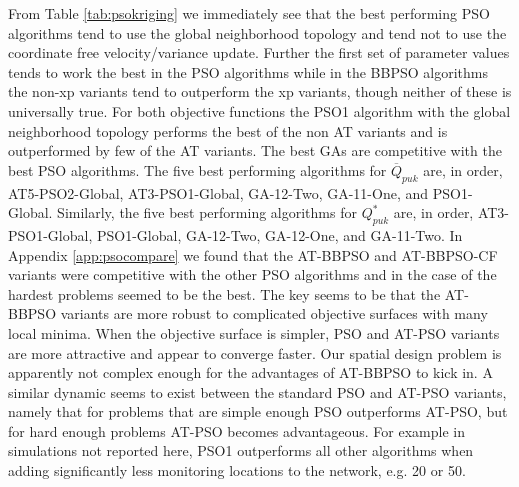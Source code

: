 \documentclass[cmbright]{staauth}
\begin{document}
From Table \ref{tab:psokriging} we immediately see that the best performing PSO algorithms tend to use the global neighborhood topology and tend not to use the coordinate free velocity/variance update. Further the first set of parameter values tends to work the best in the PSO algorithms while in the BBPSO algorithms the non-xp variants tend to outperform the xp variants, though neither of these is universally true. For both objective functions the PSO1 algorithm with the global neighborhood topology performs the best of the non AT variants and is outperformed by few of the AT variants. The best GAs are competitive with the best PSO algorithms. The five best performing algorithms for $\overline{Q}_{puk}$ are, in order, AT5-PSO2-Global, AT3-PSO1-Global, GA-12-Two, GA-11-One, and PSO1-Global. Similarly, the five best performing algorithms for $Q^*_{puk}$ are, in order, AT3-PSO1-Global, PSO1-Global, GA-12-Two, GA-12-One, and GA-11-Two. In Appendix \ref{app:psocompare} we found that the AT-BBPSO and AT-BBPSO-CF variants were competitive with the other PSO algorithms and in the case of the hardest problems seemed to be the best. The key seems to be that the AT-BBPSO variants are more robust to complicated objective surfaces with many local minima. When the objective surface is simpler, PSO and AT-PSO variants are more attractive and appear to converge faster. Our spatial design problem is apparently not complex enough for the advantages of AT-BBPSO to kick in. A similar dynamic seems to exist between the standard PSO and AT-PSO variants, namely that for problems that are simple enough PSO outperforms AT-PSO, but for hard enough problems AT-PSO becomes advantageous. For example in simulations not reported here, PSO1 outperforms all other algorithms when adding significantly less monitoring locations to the network, e.g. 20 or 50.
\end{document}
